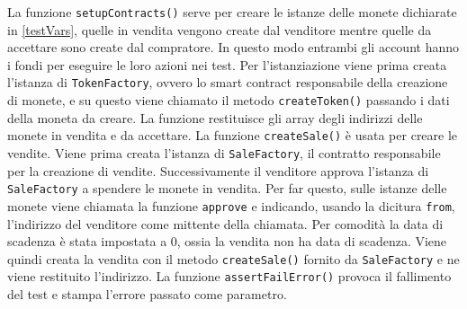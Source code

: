 \documentclass[a4paper]{article}
\begin{document}
        La funzione \verb|setupContracts()| serve per creare le istanze delle monete dichiarate in \ref{testVars}, quelle in vendita vengono create dal venditore mentre quelle da accettare sono create dal compratore.
        In questo modo entrambi gli account hanno i fondi per eseguire le loro azioni nei test. Per l'istanziazione viene prima creata l'istanza di \verb|TokenFactory|, ovvero lo smart contract responsabile della creazione di monete,
        e su questo viene chiamato il metodo \verb|createToken()| passando i dati della moneta da creare. La funzione restituisce gli array degli indirizzi delle monete in vendita e da accettare.
        \newline
        La funzione \verb|createSale()| è usata per creare le vendite. Viene prima creata l'istanza di \verb|SaleFactory|, il contratto responsabile per la creazione di vendite. Successivamente il venditore approva l'istanza di \verb|SaleFactory| a spendere le monete in vendita.
        Per far questo, sulle istanze delle monete viene chiamata la funzione \verb|approve| e indicando, usando la dicitura \verb|from|, l'indirizzo del venditore come mittente della chiamata. Per comodità la data di scadenza è stata impostata a 0, ossia la vendita non ha data di scadenza.
        Viene quindi creata la vendita con il metodo \verb|createSale()| fornito da \verb|SaleFactory| e ne viene restituito l'indirizzo.
        \newline
        La funzione \verb|assertFailError()| provoca il fallimento del test e stampa l'errore passato come parametro.
\end{document}
